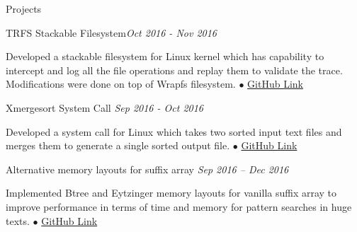\documentclass{resume} %
\begin{document}
\begin{rSection}{Projects}

\begin{rSubsection}{TRFS Stackable Filesystem}{\emph{Oct 2016 - Nov 2016}}{}{}
\item Developed a stackable filesystem for Linux kernel which has capability to intercept and log all the file operations and replay them to validate the trace. Modifications were done on top of Wrapfs filesystem.
{\tiny$\bullet$}
\href{https://github.com/t-lohani/TRFS-Stackable-Filesystem}{GitHub Link}
\newline
\newline
\end{rSubsection}


\begin{rSubsection}{Xmergesort System Call} {\emph {Sep 2016 - Oct 2016}}{}{}
\item Developed a system call for Linux which takes two sorted input text files and merges them to generate a single sorted output file.
{\tiny$\bullet$}     
\href{https://github.com/t-lohani/Xmergesort-System-Call}{GitHub Link}
\end{rSubsection}


\begin{rSubsection}{Alternative memory layouts for suffix array} {\emph {Sep 2016 -- Dec 2016}}{}{}
\item Implemented Btree and Eytzinger memory layouts for vanilla suffix array to improve performance in terms of time and memory for pattern searches in huge texts.
{\tiny$\bullet$}
\href{https://github.com/t-lohani/Suffixarray-Layout}{GitHub Link} 
\end{rSubsection}




\end{rSection}
\end{document}
